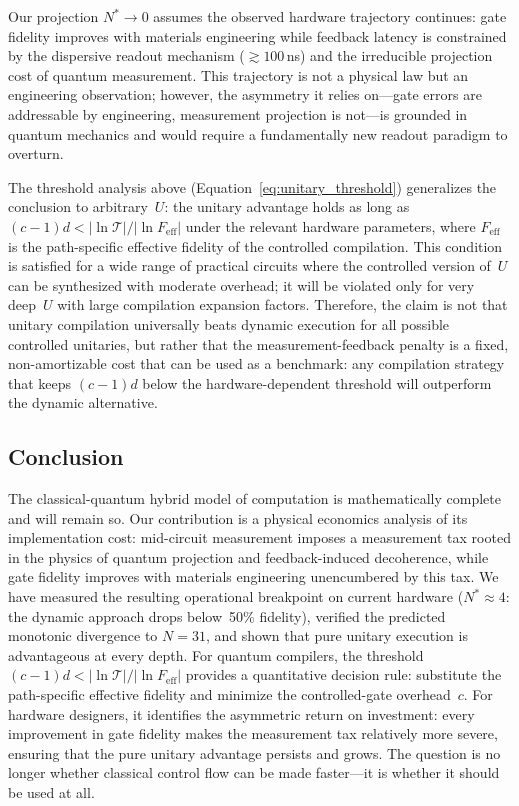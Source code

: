 \documentclass[11pt]{article}
\begin{document}
Our projection $N^* \to 0$ assumes the observed hardware trajectory continues: gate fidelity improves with materials engineering while feedback latency is constrained by the dispersive readout mechanism ($\gtrsim 100\,$ns) and the irreducible projection cost of quantum measurement.
This trajectory is not a physical law but an engineering observation; however, the asymmetry it relies on---gate errors are addressable by engineering, measurement projection is not---is grounded in quantum mechanics and would require a fundamentally new readout paradigm to overturn.

The threshold analysis above (Equation~\ref{eq:unitary_threshold}) generalizes the conclusion to arbitrary~$U$: the unitary advantage holds as long as $(c-1)d < |\ln\mathcal{T}|/|\ln F_{\text{eff}}|$ under the relevant hardware parameters, where $F_{\text{eff}}$ is the path-specific effective fidelity of the controlled compilation.
This condition is satisfied for a wide range of practical circuits where the controlled version of~$U$ can be synthesized with moderate overhead; it will be violated only for very deep~$U$ with large compilation expansion factors.
Therefore, the claim is not that unitary compilation universally beats dynamic execution for all possible controlled unitaries, but rather that the measurement-feedback penalty is a fixed, non-amortizable cost that can be used as a benchmark: any compilation strategy that keeps $(c-1)d$ below the hardware-dependent threshold will outperform the dynamic alternative.

\subsection{Conclusion}

The classical-quantum hybrid model of computation is mathematically complete and will remain so.
Our contribution is a physical economics analysis of its implementation cost: mid-circuit measurement imposes a measurement tax rooted in the physics of quantum projection and feedback-induced decoherence, while gate fidelity improves with materials engineering unencumbered by this tax.
We have measured the resulting operational breakpoint on current hardware ($N^* \approx 4$: the dynamic approach drops below~50\% fidelity), verified the predicted monotonic divergence to $N = 31$, and shown that pure unitary execution is advantageous at every depth.
For quantum compilers, the threshold $(c{-}1)d < |\ln\mathcal{T}|/|\ln F_{\text{eff}}|$ provides a quantitative decision rule: substitute the path-specific effective fidelity and minimize the controlled-gate overhead~$c$.
For hardware designers, it identifies the asymmetric return on investment: every improvement in gate fidelity makes the measurement tax relatively more severe, ensuring that the pure unitary advantage persists and grows.
The question is no longer whether classical control flow can be made faster---it is whether it should be used at all.
\end{document}
